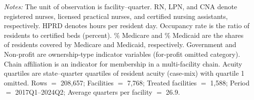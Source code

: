 \begin{table}[!ht]
\begin{threeparttable}
\begin{tablenotes}[flushleft]
\footnotesize
\item \textit{Notes:} The unit of observation is facility--quarter. RN, LPN, and CNA denote registered nurses, licensed practical nurses, and certified nursing assistants, respectively. HPRD denotes hours per resident day. Occupancy rate is the ratio of residents to certified beds (percent). \% Medicare and \% Medicaid are the shares of residents covered by Medicare and Medicaid, respectively. Government and Non-profit are ownership-type indicator variables (for-profit omitted category). Chain affiliation is an indicator for membership in a multi-facility chain. Acuity quartiles are state--quarter quartiles of resident acuity (case-mix) with quartile 1 omitted. Rows $=$ 208,657; Facilities $=$ 7,768; Treated facilities $=$ 1,588; Period $=$ 2017Q1--2024Q2; Average quarters per facility $=$ 26.9.
\end{tablenotes}

\end{threeparttable}
\end{table}
